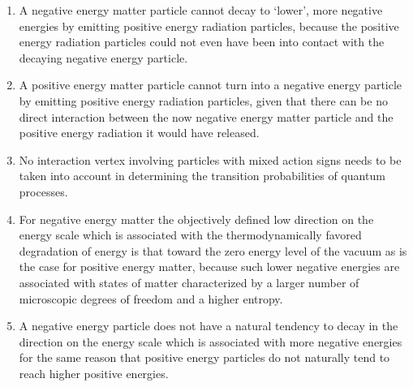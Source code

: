 \documentclass[notitlepage,12pt]{report}
\begin{document}
\begin{enumerate}
\item A negative energy matter particle cannot decay to `lower', more negative energies by emitting positive energy radiation particles, because the positive energy radiation particles could not even have been into contact with the decaying negative energy particle.

\item A positive energy matter particle cannot turn into a negative energy particle by emitting positive energy radiation particles, given that there can be no direct interaction between the now negative energy matter particle and the positive energy radiation it would have released.

\item No interaction vertex involving particles with mixed action signs needs to be taken into account in determining the transition probabilities of quantum processes.

\item For negative energy matter the objectively defined low direction on the energy scale which is associated with the thermodynamically favored degradation of energy is that toward the zero energy level of the vacuum as is the case for positive energy matter, because such lower negative energies are associated with states of matter characterized by a larger number of microscopic degrees of freedom and a higher entropy.

\item A negative energy particle does not have a natural tendency to decay in the direction on the energy scale which is associated with more negative energies for the same reason that positive energy particles do not naturally tend to reach higher positive energies.


\end{enumerate}
\end{document}
